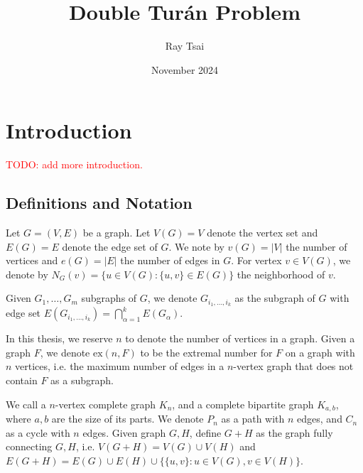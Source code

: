 \documentclass[12pt]{report}
\title{Double Turán Problem}
\author{Ray Tsai}
\date{November 2024}
\begin{document}
\maketitle



\tableofcontents

\chapter{Introduction}

\textcolor{red}{TODO: add more introduction.}

\section{Definitions and Notation}
Let $G = (V, E)$ be a graph. Let $V(G) = V$ denote the vertex set and $E(G) = E$ denote the edge set
of $G$. We note by $v(G) = |V|$ the number of vertices and $e(G) = |E|$ the number of edges in $G$.
For vertex $v \in V(G)$, we denote by $N_G(v) = \{u \in V(G) : \{u, v\} \in E(G)\}$ the neighborhood
of $v$.

Given $G_1, \ldots, G_m$ subgraphs of $G$, we denote $G_{i_1, \ldots, i_k}$ as the subgraph of $G$
with edge set $E(G_{i_1, \ldots, i_k}) = \bigcap_{\alpha = 1}^k E(G_{\alpha})$. 

In this thesis, we reserve $n$ to denote the number of vertices in a graph. Given a graph $F$, we
denote $\text{ex}(n, F)$ to be the extremal number for $F$ on a graph with $n$ vertices, i.e. the
maximum number of edges in a $n$-vertex graph that does not contain $F$ as a subgraph.

We call a $n$-vertex complete graph $K_n$, and a complete bipartite graph $K_{a, b}$, where $a, b$
are the size of its parts. We denote $P_n$ as a path with $n$ edges, and $C_n$ as a cycle with
$n$ edges. Given graph $G, H$, define $G + H$ as the graph fully connecting $G, H$, i.e. $V(G + H) =
V(G) \cup V(H)$ and $E(G + H) = E(G) \cup E(H) \cup \{\{u, v\} : u \in V(G), v \in V(H)\}$.
\end{document}
